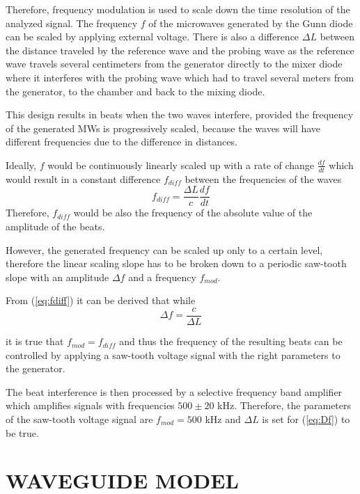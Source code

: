 \documentclass[twoside]{articlek}
\begin{document}
Therefore, frequency modulation is used to scale down the time resolution of the analyzed signal. The frequency $f$ of the microwaves generated by the Gunn diode can be scaled by applying external voltage. There is also a difference $\Delta L$ between the distance traveled by the reference wave and the probing wave as the reference wave travels several centimeters from the generator directly to the mixer diode where it interferes with the probing wave which had to travel several meters from the generator, to the chamber and back to the mixing diode.

This design results in beats when the two waves interfere, provided the frequency of the generated MWs is progressively scaled, because the waves will have different frequencies due to the difference in distances. 

Ideally, $f$ would be continuously linearly scaled up with a rate of change $\frac{df}{dt}$ which would result in a constant difference $f_{diff}$ between the frequencies of the waves 
\begin{equation}
f_{diff}=\frac{\Delta L}{c} \frac{df}{dt}
\label{eq:fdiff}
\end{equation}
 Therefore, $f_{diff}$ would be also the frequency of the absolute value of the amplitude of the beats.

However, the generated frequency can be scaled up only to a certain level, therefore the linear scaling slope has to be broken down to a periodic saw-tooth slope with an amplitude $\Delta f$ and a frequency $f_{mod}$.

From (\ref{eq:fdiff}) it can be derived that while 
\begin{equation}
\Delta f=\frac{c}{\Delta L}
\label{eq:Df}
\end{equation}

it is true that $f_{mod}=f_{diff}$ and thus the frequency of the resulting beats can be controlled by applying a saw-tooth voltage signal with the right parameters to the generator. 

The beat interference is then processed by a selective frequency band amplifier which amplifies signals with frequencies $500 \pm 20$ kHz. Therefore, the parameters of the saw-tooth voltage signal are $f_{mod}=500$ kHz and $\Delta L$ is set for (\ref{eq:Df}) to be true.

\section{WAVEGUIDE MODEL}
\end{document}
